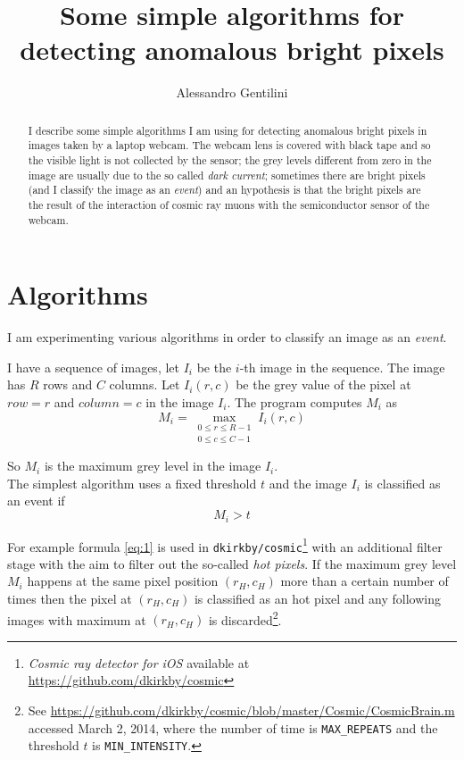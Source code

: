 \documentclass[a4paper,12pt]{article}
\title{Some simple algorithms for detecting anomalous bright pixels}
\author{Alessandro Gentilini}
\begin{document}
\maketitle

\begin{abstract}
I describe some simple algorithms I am using for detecting anomalous bright 
pixels in images taken by a laptop webcam.
The webcam lens is covered with black tape and so the visible light is not 
collected by the sensor; the grey levels different from zero in the image are 
usually due to the so called \emph{dark current}; sometimes there are bright 
pixels (and I classify the image as an \emph{event}) and an hypothesis is that 
the bright pixels are the result of the interaction of cosmic ray muons with the 
semiconductor sensor of the webcam.
\end{abstract} 

\section{Algorithms}
I am experimenting various algorithms in order to classify an image as an 
\emph{event}.

I have a sequence of images, let $I_i$ be the $i$-th image in the sequence. The 
image has $R$ rows and $C$ columns. Let $I_i(r,c)$ be the grey value of the pixel 
at $row=r$ and $column=c$ in the image $I_i$.
The program computes $M_i$ as 
$$M_i=\max_{\substack{
   0\leq r\leq R-1 \\
   0\leq c\leq C-1
  }}
 I_i(r,c)$$

So $M_i$ is the maximum grey level in the image $I_i$.\\

The simplest algorithm uses a fixed threshold $t$ and the image $I_i$ is 
classified as an event if 
\begin{equation}
M_i>t \label{eq:1}
\end{equation}

For example formula \ref{eq:1} is used in 
\texttt{dkirkby/cosmic}\footnote{\emph{Cosmic ray detector for iOS} available at 
\url{https://github.com/dkirkby/cosmic}} with an additional filter stage with 
the aim to filter out the so-called \emph{hot pixels}. If the maximum grey level 
$M_i$ happens at the same pixel position $(r_H,c_H)$ more than a certain number 
of times then the pixel at $(r_H,c_H)$ is classified as an hot pixel and any 
following images with maximum at $(r_H,c_H)$ is discarded\footnote{See 
\url{https://github.com/dkirkby/cosmic/blob/master/Cosmic/CosmicBrain.m} 
accessed March 2, 2014, where the number of time is \texttt{MAX\_REPEATS} 
and the threshold $t$ is \texttt{MIN\_INTENSITY}.}.\\
\end{document}
